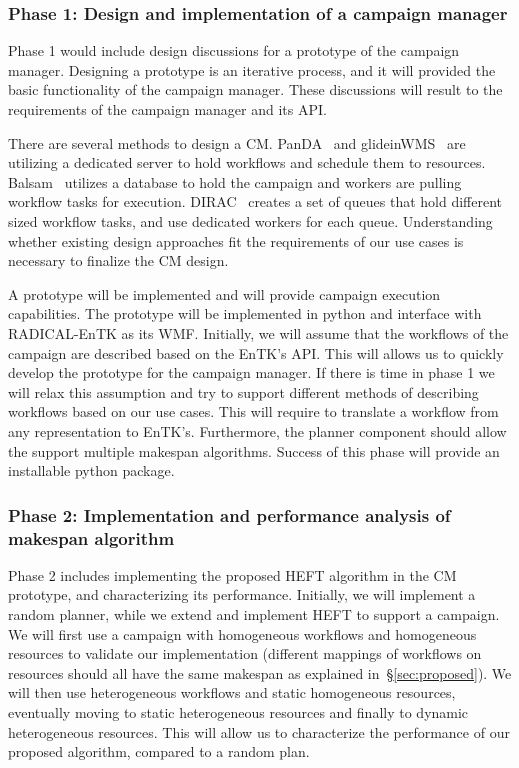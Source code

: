 \subsubsection{Phase 1: Design and implementation of a campaign manager}
\label{obj1}

Phase 1 would include design discussions for a prototype of the campaign manager.
Designing a prototype is an iterative process, and it will provided the basic functionality of the campaign manager.
These discussions will result to the requirements of the campaign manager and its API.

There are several methods to design a CM.
PanDA~\cite{maeno2008panda} and glideinWMS~\cite{sfiligoi2008glidein} are utilizing a dedicated server to hold workflows and schedule them to resources.
Balsam~\cite{salim2019balsam} utilizes a database to hold the campaign and workers are pulling workflow tasks for execution.
DIRAC~\cite{casajus2010dirac} creates a set of queues that hold different sized workflow tasks, and use dedicated workers for each queue.
Understanding whether existing design approaches fit the requirements of our use cases is necessary to finalize the CM design.

A prototype will be implemented and will provide campaign execution capabilities.
The prototype will be implemented in python and interface with RADICAL-EnTK as its WMF.
Initially, we will assume that the workflows of the campaign are described based on the EnTK's API.
This will allows us to quickly develop the prototype for the campaign manager.
If there is time in phase 1 we will relax this assumption and try to support different methods of describing workflows based on our use cases.
This will require to translate a workflow from any representation to EnTK's.
Furthermore, the planner component should allow the support multiple makespan algorithms.
Success of this phase will provide an installable python package. 


\subsubsection{Phase 2: Implementation and performance analysis of makespan algorithm}
\label{obj2}
Phase 2 includes implementing the proposed HEFT algorithm in the CM prototype, and characterizing its performance.
Initially, we will implement a random planner, while we extend and implement HEFT to support a campaign.
We will first use a campaign with homogeneous workflows and homogeneous resources to validate our implementation (different mappings of workflows on resources should all have the same makespan as explained in~\S\ref{sec:proposed}). We will then use heterogeneous workflows and static homogeneous resources, eventually moving to static heterogeneous resources and finally to dynamic heterogeneous resources.
This will allow us to characterize the performance of our proposed algorithm, compared to a random plan.

